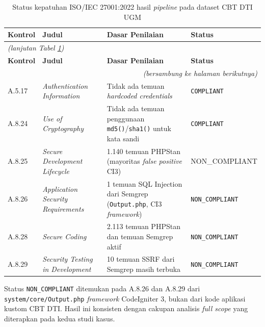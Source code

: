 \begin{longtable}{|l|>{\raggedright\arraybackslash}p{2.5cm}|p{6cm}|p{3cm}|}
\caption{Status kepatuhan ISO/IEC 27001:2022 hasil 
\textit{pipeline} pada dataset CBT DTI UGM}
\label{tab:iso-status-dti} \\
\hline
\textbf{Kontrol} & \textbf{Judul} & \textbf{Dasar Penilaian} 
& \textbf{Status} \\
\hline \hline
\endfirsthead

\multicolumn{4}{l}{\textit{(lanjutan Tabel \ref{tab:iso-status-dti})}} \\
\hline
\textbf{Kontrol} & \textbf{Judul} & \textbf{Dasar Penilaian} 
& \textbf{Status} \\
\hline \hline
\endhead

\hline
\multicolumn{4}{r}{\textit{(bersambung ke halaman berikutnya)}} \\
\endfoot

\hline
\endlastfoot

A.5.17 & \textit{Authentication Information} & 
Tidak ada temuan \textit{hardcoded credentials} & 
\texttt{COMPLIANT} \\
\hline

A.8.24 & \textit{Use of Cryptography} & 
Tidak ada temuan penggunaan \texttt{md5()}/\texttt{sha1()} 
untuk kata sandi & 
\texttt{COMPLIANT} \\
\hline

A.8.25 & \textit{Secure Development Lifecycle} & 
1.140 temuan PHPStan (mayoritas \textit{false positive} CI3) & 
{\footnotesize\ttfamily NON\_COMPLIANT} \\
\hline

A.8.26 & \textit{Application Security Requirements} &
1 temuan SQL Injection dari Semgrep (\texttt{Output.php},
CI3 \textit{framework}) & 
{\footnotesize \texttt{NON\_COMPLIANT}} \\
\hline

A.8.28 & \textit{Secure Coding} & 
2.113 temuan PHPStan dan temuan Semgrep aktif & 
{\footnotesize \texttt{NON\_COMPLIANT}} \\
\hline

A.8.29 & \textit{Security Testing in Development} & 
10 temuan SSRF dari Semgrep masih terbuka & 
{\footnotesize \texttt{NON\_COMPLIANT}} \\
\end{longtable}
Status \texttt{NON\_COMPLIANT} ditemukan pada A.8.26 dan A.8.29
dari \texttt{system/core/\allowbreak Output.php} \textit{framework} 
CodeIgniter 3, bukan dari kode aplikasi kustom CBT DTI. 
Hasil ini konsisten dengan cakupan analisis \textit{full scope} 
yang diterapkan pada kedua studi kasus.

